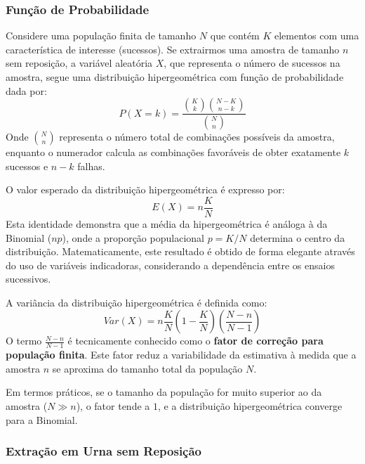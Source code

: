 \subsubsection{Função de Probabilidade}

Considere uma população finita de tamanho $N$ que contém $K$ elementos com uma característica de interesse (sucessos). Se extrairmos uma amostra de tamanho $n$ sem reposição, a variável aleatória $X$, que representa o número de sucessos na amostra, segue uma distribuição hipergeométrica com função de probabilidade dada por:
\[
P(X=k)=\frac{\binom{K}{k}\binom{N-K}{n-k}}{\binom{N}{n}}
\]
Onde $\binom{N}{n}$ representa o número total de combinações possíveis da amostra, enquanto o numerador calcula as combinações favoráveis de obter exatamente $k$ sucessos e $n-k$ falhas.


O valor esperado da distribuição hipergeométrica é expresso por:
\[
E(X)=n\frac{K}{N}
\]
Esta identidade demonstra que a média da hipergeométrica é análoga à da Binomial ($np$), onde a proporção populacional $p = K/N$ determina o centro da distribuição. Matematicamente, este resultado é obtido de forma elegante através do uso de variáveis indicadoras, considerando a dependência entre os ensaios sucessivos. \vskip0.3cm


A variância da distribuição hipergeométrica é definida como:
\[
Var(X)=n\frac{K}{N}\left(1-\frac{K}{N}\right)\left(\frac{N-n}{N-1}\right)
\]
O termo $\frac{N-n}{N-1}$ é tecnicamente conhecido como o \textbf{fator de correção para população finita}. Este fator reduz a variabilidade da estimativa à medida que a amostra $n$ se aproxima do tamanho total da população $N$. \vskip0.3cm

Em termos práticos, se o tamanho da população for muito superior ao da amostra ($N \gg n$), o fator tende a $1$, e a distribuição hipergeométrica converge para a Binomial. \vskip0.3cm

\subsubsection*{Extração em Urna sem Reposição}

